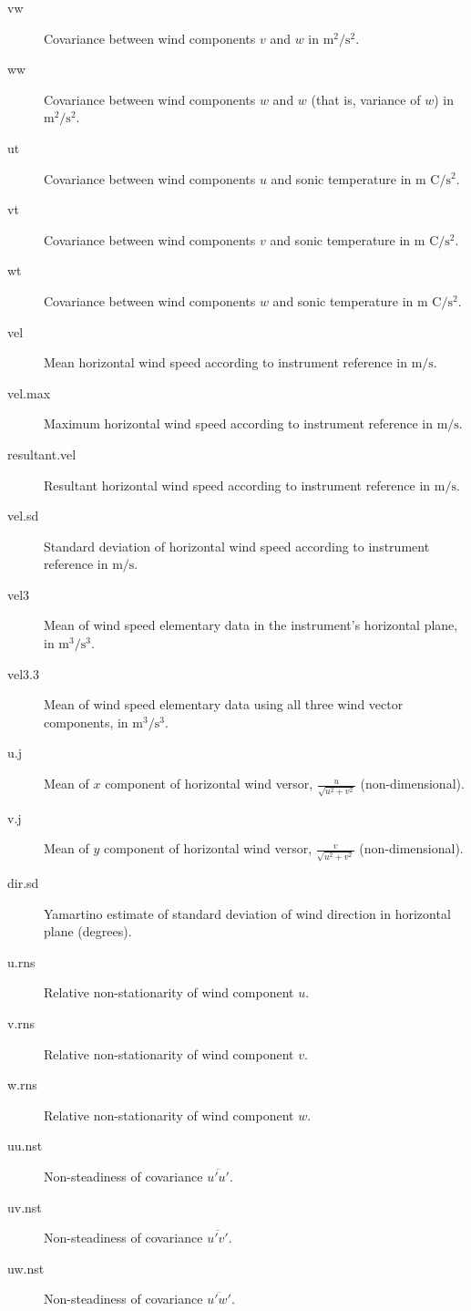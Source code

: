 \documentclass[a4paper,10pt]{book}
\begin{document}
\begin{description}
 \item[vw] Covariance between wind components $v$ and $w$ in $\mbox{m}^2/\mbox{s}^2$.
 \item[ww] Covariance between wind components $w$ and $w$ (that is, variance of $w$) in $\mbox{m}^2/\mbox{s}^2$.
 \item[ut] Covariance between wind components $u$ and sonic temperature in $\mbox{m C}/\mbox{s}^2$.
 \item[vt] Covariance between wind components $v$ and sonic temperature in $\mbox{m C}/\mbox{s}^2$.
 \item[wt] Covariance between wind components $w$ and sonic temperature in $\mbox{m C}/\mbox{s}^2$.
 \item[vel] Mean horizontal wind speed according to instrument reference in $\mbox{m}/\mbox{s}$.
 \item[vel.max] Maximum horizontal wind speed according to instrument reference in $\mbox{m}/\mbox{s}$.
 \item[resultant.vel] Resultant horizontal wind speed according to instrument reference in $\mbox{m}/\mbox{s}$.
 \item[vel.sd] Standard deviation of horizontal wind speed according to instrument reference in $\mbox{m}/\mbox{s}$.
 \item[vel3] Mean of wind speed elementary data in the instrument's horizontal plane, in $\mbox{m}^{3}/\mbox{s}^{3}$.
 \item[vel3.3] Mean of wind speed elementary data using all three wind vector components, in $\mbox{m}^{3}/\mbox{s}^{3}$.
 \item[u.j] Mean of $x$ component of horizontal wind versor, $\frac{u}{\sqrt{u^2+v^2}}$ (non-dimensional).
 \item[v.j] Mean of $y$ component of horizontal wind versor, $\frac{v}{\sqrt{u^2+v^2}}$ (non-dimensional).
 \item[dir.sd] Yamartino estimate of standard deviation of wind direction in horizontal plane (degrees).
 \item[u.rns] Relative non-stationarity of wind component $u$.
 \item[v.rns] Relative non-stationarity of wind component $v$.
 \item[w.rns] Relative non-stationarity of wind component $w$.
 \item[uu.nst] Non-steadiness of covariance $\overline{u'u'}$.
 \item[uv.nst] Non-steadiness of covariance $\overline{u'v'}$.
 \item[uw.nst] Non-steadiness of covariance $\overline{u'w'}$.

\end{description}
\end{document}
